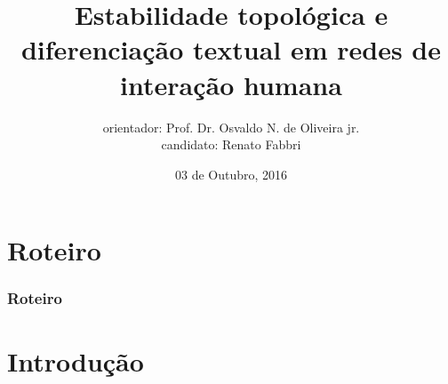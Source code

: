\documentclass[10pt]{beamer}
\begin{document}
\title {\bfseries{\sc\large Estabilidade topológica e diferenciação textual
em redes de interação humana}}


\author[Renato Fabbri]{\small {orientador: Prof. Dr. Osvaldo N. de Oliveira jr.\\
		candidato: Renato Fabbri\\
}}

\date{\small 03 de Outubro, 2016} 
\begin{frame}
\titlepage
\end{frame}
\section*{Roteiro}
\begin{frame}
\frametitle{Roteiro}  
\tableofcontents
\end{frame}

\section{Introdução}
\end{document}
